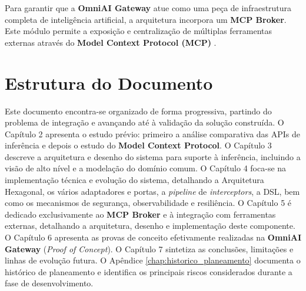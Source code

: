     Para garantir que a \textbf{OmniAI Gateway} atue como uma peça de infraestrutura completa de inteligência artificial, a arquitetura incorpora um \textbf{MCP Broker}. Este módulo permite a exposição  e centralização de múltiplas ferramentas externas através do \textbf{Model Context Protocol (MCP)} \cite{mcp_protocol}.   

    \section{Estrutura do Documento}
    Este documento encontra-se organizado de forma progressiva, partindo do problema de integração e avançando até à validação da solução construída. O Capítulo 2 apresenta o estudo prévio: primeiro a análise comparativa das APIs de inferência e depois o estudo do \textbf{Model Context Protocol}. O Capítulo 3 descreve a arquitetura e desenho do sistema para suporte à inferência, incluindo a visão de alto nível e a modelação do domínio comum. O Capítulo 4 foca-se na implementação técnica e evolução do sistema, detalhando a Arquitetura Hexagonal, os vários adaptadores e portas, a \textit{pipeline} de \textit{interceptors}, a DSL, bem como os mecanismos de segurança, observabilidade e resiliência. O Capítulo 5 é dedicado exclusivamente ao \textbf{MCP Broker} e à integração com ferramentas externas, detalhando a arquitetura, desenho e implementação deste componente. O Capítulo 6 apresenta as provas de conceito efetivamente realizadas na \textbf{OmniAI Gateway} (\textit{Proof of Concept}). O Capítulo 7 sintetiza as conclusões, limitações e linhas de evolução futura. O Apêndice \ref{chap:historico_planeamento} documenta o histórico de planeamento e identifica os principais riscos considerados durante a fase de desenvolvimento.